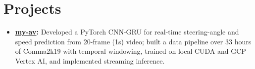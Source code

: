 \documentclass[11pt, letterpaper]{article}
\begin{document}
\section{Projects}
\begin{itemize}
  \item \textbf{\href{https://github.com/lordphone/my-av}{my-av}:} Developed a PyTorch CNN-GRU for real-time steering-angle and speed prediction from 20-frame (1s) video; built a data pipeline over 33 hours of Comma2k19 with temporal windowing, trained on local CUDA and GCP Vertex AI, and implemented streaming inference.
\end{itemize}
\end{document}
